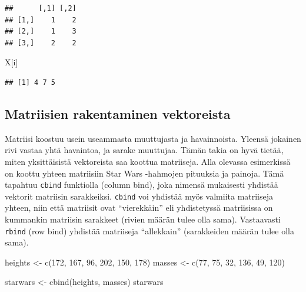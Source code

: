 \documentclass[
]{book}
\newenvironment{Shaded}{\begin{snugshade}}{\end{snugshade}}
\newcommand{\DecValTok}[1]{\textcolor[rgb]{0.00,0.00,0.81}{#1}}
\newcommand{\FunctionTok}[1]{\textcolor[rgb]{0.00,0.00,0.00}{#1}}
\newcommand{\NormalTok}[1]{#1}
\newcommand{\OtherTok}[1]{\textcolor[rgb]{0.56,0.35,0.01}{#1}}
\begin{document}
\begin{verbatim}
##      [,1] [,2]
## [1,]    1    2
## [2,]    1    3
## [3,]    2    2
\end{verbatim}

\begin{Shaded}
\begin{Highlighting}[]
\NormalTok{X[i]}
\end{Highlighting}
\end{Shaded}

\begin{verbatim}
## [1] 4 7 5
\end{verbatim}

\hypertarget{matriisien-rakentaminen-vektoreista}{%
\subsection{Matriisien rakentaminen vektoreista}\label{matriisien-rakentaminen-vektoreista}}

Matriisi koostuu usein useammasta muuttujasta ja havainnoista. Yleensä jokainen rivi vastaa yhtä havaintoa, ja sarake muuttujaa. Tämän takia on hyvä tietää, miten yksittäisistä vektoreista saa koottua matriiseja. Alla olevassa esimerkissä on koottu yhteen matriisiin Star Wars -hahmojen pituuksia ja painoja. Tämä tapahtuu \texttt{cbind} funktiolla (column bind), joka nimensä mukaisesti yhdistää vektorit matriisin sarakkeiksi. \texttt{cbind} voi yhdistää myös valmiita matriiseja yhteen, niin että matriisit ovat ``vierekkäin'' eli yhdistetyssä matriisissa on kummankin matriisin sarakkeet (rivien määrän tulee olla sama). Vastaavasti \texttt{rbind} (row bind) yhdistää matriiseja ``allekkain'' (sarakkeiden määrän tulee olla sama).

\begin{Shaded}
\begin{Highlighting}[]
\NormalTok{heights }\OtherTok{\textless{}{-}} \FunctionTok{c}\NormalTok{(}\DecValTok{172}\NormalTok{, }\DecValTok{167}\NormalTok{, }\DecValTok{96}\NormalTok{, }\DecValTok{202}\NormalTok{, }\DecValTok{150}\NormalTok{, }\DecValTok{178}\NormalTok{)}
\NormalTok{masses }\OtherTok{\textless{}{-}} \FunctionTok{c}\NormalTok{(}\DecValTok{77}\NormalTok{, }\DecValTok{75}\NormalTok{, }\DecValTok{32}\NormalTok{, }\DecValTok{136}\NormalTok{, }\DecValTok{49}\NormalTok{, }\DecValTok{120}\NormalTok{)}

\NormalTok{starwars }\OtherTok{\textless{}{-}} \FunctionTok{cbind}\NormalTok{(heights, masses)}
\NormalTok{starwars}
\end{Highlighting}
\end{Shaded}
\end{document}
